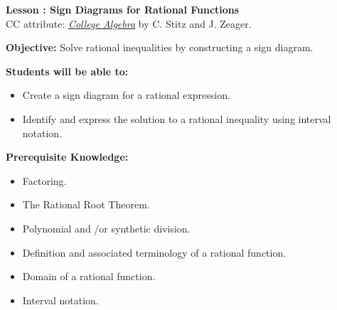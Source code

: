 \documentclass[12pt]{article}
\theoremstyle{definition}
\begin{document}
{\bf \large Lesson : Sign Diagrams for Rational Functions}\label{les:sign_diagrams_rationals}
\\ CC attribute: \href{http://www.stitz-zeager.com}{\it{College Algebra}} by C. Stitz and J. Zeager. 
\hfill \doclicenseImage[imagewidth=5em]\\
\par
{\bf Objective:} Solve rational inequalities by constructing a sign diagram.\\
\par
{\bf Students will be able to:}
\begin{itemize}
	\item Create a sign diagram for a rational expression. 
	\item Identify and express the solution to a rational inequality using interval notation.
\end{itemize}
{\bf Prerequisite Knowledge:}
\begin{itemize}
	\item Factoring.
	\item The Rational Root Theorem.
	\item Polynomial and \slash or synthetic division.
	\item Definition and associated terminology of a rational function.
	\item Domain of a rational function.
	\item Interval notation.
\end{itemize}
\hrulefill
\end{document}
